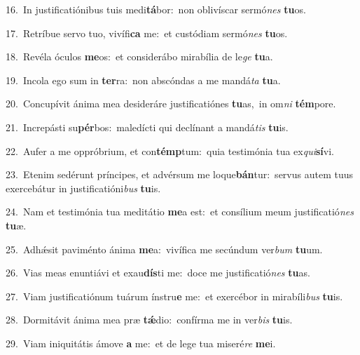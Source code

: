 {\numbfont\textcolor{\numbcolor}{16.}}~In justificatiónibus tuis medi\-\textbf{tá}\-bor:~\star non oblivíscar sermó\textit{nes} \textbf{tu}\-os.\par
{\numbfont\textcolor{\numbcolor}{17.}}~Retríbue servo tuo, vivífi\textbf{ca} me:~\star et custódiam sermó\textit{nes} \textbf{tu}\-os.\par
{\numbfont\textcolor{\numbcolor}{18.}}~Revéla óculos \textbf{me}\-os:~\star et considerábo mirabília de le\textit{ge} \textbf{tu}\-a.\par
{\numbfont\textcolor{\numbcolor}{19.}}~Incola ego sum in \textbf{ter}\-ra:~\star non abscóndas a me mandá\textit{ta} \textbf{tu}\-a.\par
{\numbfont\textcolor{\numbcolor}{20.}}~Concupívit ánima mea desideráre justificatiónes \textbf{tu}\-as,~\star in om\textit{ni} \textbf{tém}\-pore.\par
{\numbfont\textcolor{\numbcolor}{21.}}~Increpásti su\-\textbf{pér}\-bos:~\star maledícti qui declínant a mandá\textit{tis} \textbf{tu}\-is.\par
{\numbfont\textcolor{\numbcolor}{22.}}~Aufer a me oppróbrium, et con\-\textbf{témp}\-tum:~\star quia testimónia tua ex\-\textit{qui}\-\textbf{sí}vi.\par
{\numbfont\textcolor{\numbcolor}{23.}}~Etenim sedérunt príncipes, et advérsum me loque\-\textbf{bán}\-tur:~\star servus autem tuus exercebátur in justificatióni\textit{bus} \textbf{tu}\-is.\par
{\numbfont\textcolor{\numbcolor}{24.}}~Nam et testimónia tua meditátio \textbf{me}\-a est:~\star et consílium meum justificatió\textit{nes} \textbf{tu}\-æ.\par
{\numbfont\textcolor{\numbcolor}{25.}}~Adhǽsit paviménto ánima \textbf{me}\-a:~\star vivífica me secúndum ver\textit{bum} \textbf{tu}\-um.\par
{\numbfont\textcolor{\numbcolor}{26.}}~Vias meas enuntiávi et exau\-\textbf{dís}\-ti me:~\star doce me justificatió\textit{nes} \textbf{tu}\-as.\par
{\numbfont\textcolor{\numbcolor}{27.}}~Viam justificatiónum tuárum ínstru\textbf{e} me:~\star et exercébor in mirabíli\textit{bus} \textbf{tu}\-is.\par
{\numbfont\textcolor{\numbcolor}{28.}}~Dormitávit ánima mea præ \textbf{tǽ}\-dio:~\star confírma me in ver\textit{bis} \textbf{tu}\-is.\par
{\numbfont\textcolor{\numbcolor}{29.}}~Viam iniquitátis ámove \textbf{a} me:~\star et de lege tua miseré\textit{re} \textbf{me}\-i.\par
